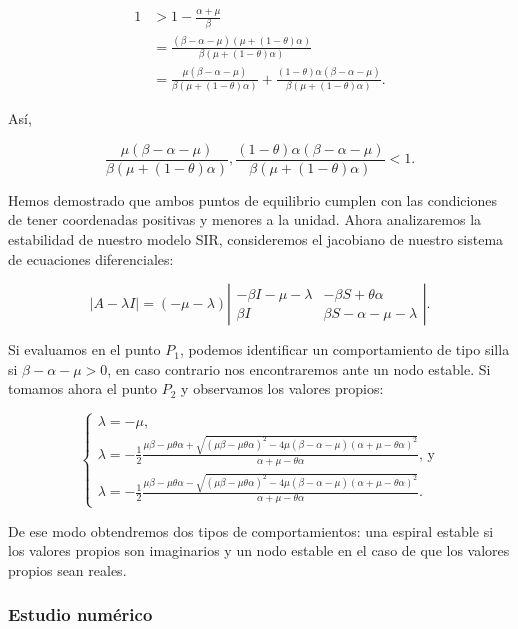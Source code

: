 \begin{align*}
1&>1-\frac{\alpha+\mu}{\beta} \\
&= \frac{(\beta-\alpha-\mu)(\mu+(1-\theta)\alpha)}{\beta(\mu+(1-\theta)\alpha)}\\
&= \frac{\mu(\beta-\alpha-\mu)}{\beta(\mu+(1-\theta)\alpha)}+\frac{(1-\theta)\alpha(\beta-\alpha-\mu)}{\beta(\mu+(1-\theta)\alpha)}.
\end{align*}

Así,

$$\frac{\mu(\beta-\alpha-\mu)}{\beta(\mu+(1-\theta)\alpha)},\frac{(1-\theta)\alpha(\beta-\alpha-\mu)}{\beta(\mu+(1-\theta)\alpha)}<1.$$

Hemos demostrado que ambos puntos de equilibrio cumplen con las condiciones de tener coordenadas positivas y menores a la unidad. Ahora analizaremos la estabilidad de nuestro modelo SIR, consideremos el jacobiano de nuestro sistema de ecuaciones diferenciales:

$$|A-\lambda I|=(-\mu-\lambda)
\left|\begin{array}{cc}
-\beta I-\mu-\lambda & -\beta S+\theta\alpha\\
\beta I & \beta S-\alpha-\mu -\lambda
\end{array}\right|.$$

Si evaluamos en el punto $P_1$, podemos identificar un comportamiento de tipo silla si $\beta-\alpha-\mu>0$, en caso contrario nos encontraremos ante un nodo estable. Si tomamos ahora el punto $P_2$ y observamos los valores propios:

$$\left\{\begin{array}{l}
\lambda=-\mu,\\
\lambda=-\frac{1}{2}\frac{\mu\beta-\mu\theta\alpha+\sqrt{(\mu\beta-\mu\theta\alpha)^2-4\mu(\beta-\alpha-\mu)(\alpha+\mu-\theta\alpha)^2}}{\alpha+\mu-\theta\alpha} \text{, y}\\
\lambda=-\frac{1}{2}\frac{\mu\beta-\mu\theta\alpha-\sqrt{(\mu\beta-\mu\theta\alpha)^2-4\mu(\beta-\alpha-\mu)(\alpha+\mu-\theta\alpha)^2}}{\alpha+\mu-\theta\alpha}.
\end{array}\right.$$

De ese modo obtendremos dos tipos de comportamientos: una espiral estable si los valores propios son imaginarios y un nodo estable en el caso de que los valores propios sean reales.

\subsubsection{Estudio numérico}

